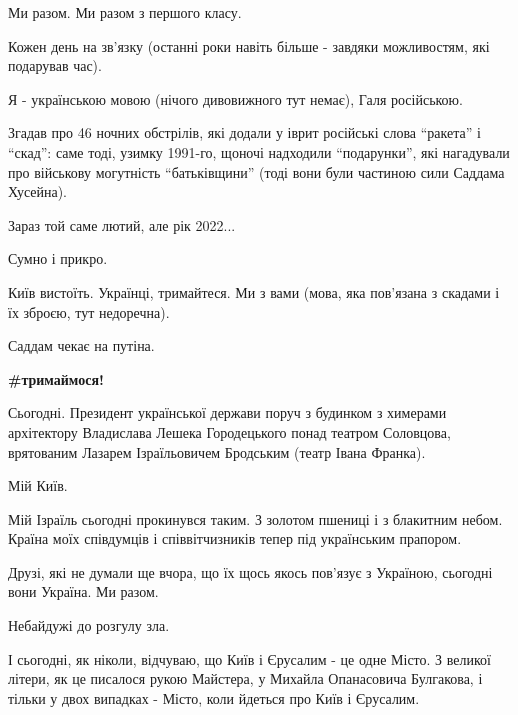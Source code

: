 Ми разом. Ми разом з першого класу.

Кожен день на зв'язку (останні роки навіть більше - завдяки можливостям, які
подарував час).

Я - українською мовою (нічого дивовижного тут немає), Галя російською.

Згадав про 46 ночних обстрілів, які додали у іврит російські слова \enquote{ракета} і
\enquote{скад}: саме тоді, узимку 1991-го, щоночі надходили \enquote{подарунки}, які нагадували
про військову могутність \enquote{батьківщини} (тоді вони були частиною сили Саддама
Хусейна).

Зараз той саме лютий, але рік 2022...

Сумно і прикро. 

Київ вистоїть. Українці, тримайтеся. Ми з вами (мова, яка пов'язана з скадами і
їх зброєю, тут недоречна).

Саддам чекає на путіна.

\textbf{\#тримаймося!}

Сьогодні. Президент української держави поруч з будинком з химерами архітектору
Владислава Лешека Городецького понад театром Соловцова, врятованим Лазарем
Ізраїльовичем Бродським (театр Івана Франка).

Мій Київ.

Мій Ізраїль сьогодні прокинувся таким. З золотом пшениці і з блакитним небом.
Країна моїх співдумців і співвітчизників тепер під українським прапором.

Друзі, які не думали ще вчора, що їх щось якось пов'язує з Україною, сьогодні
вони Україна. Ми разом.

Небайдужі до розгулу зла.

І сьогодні, як ніколи, відчуваю, що Київ і Єрусалим - це одне Місто. З великої
літери, як це писалося рукою Майстера, у Михайла Опанасовича Булгакова, і
тільки у двох випадках - Місто, коли йдеться про Київ і Єрусалим.
